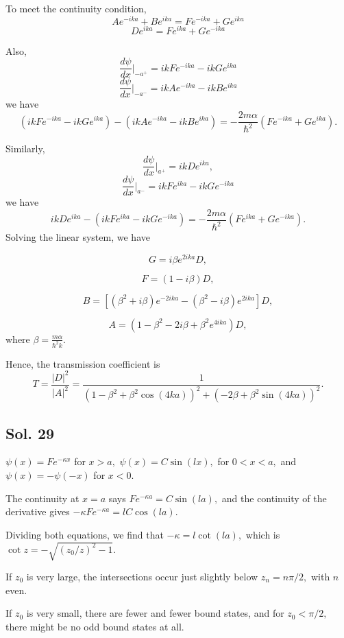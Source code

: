   To meet the continuity condition, 
    $$
    Ae^{-ika}+Be^{ika} = Fe^{-ika}+Ge^{ika}
    $$
    $$
    De^{ika} = Fe^{ika}+Ge^{-ika}
    $$

    Also,
    $$
    \frac{d\psi}{dx}\bigg|_{-a^+}=
    ikFe^{-ika} - ikGe^{ika}
    $$
    $$
    \frac{d\psi}{dx}\bigg|_{-a^-}=
    ikAe^{-ika}-ikBe^{ika}
    $$
    we have
    $$
    (ikFe^{-ika} - ikGe^{ika}) -
    (ikAe^{-ika}-ikBe^{ika})
    =-\frac{2m\alpha}{\hbar^2}
    (Fe^{-ika}+Ge^{ika}).
    $$
    
    Similarly,
     $$
    \frac{d\psi}{dx}\bigg|_{a^+}=ik De^{ika},
    $$
    $$
    \frac{d\psi}{dx}\bigg|_{a^-}=ikFe^{ika}-ikGe^{-ika}
    $$
    we have
    $$
    ik De^{ika} - (ikFe^{ika}-ikGe^{-ika})
    =-\frac{2m\alpha}{\hbar^2}(Fe^{ika}+Ge^{-ika}).  
    $$
    Solving the linear system, we have

    
    $$
    G = i\beta e^{2ika} D,
    $$
    
    $$
    F = (1-i\beta) D,
    $$
    
    $$
    B = [(\beta^2+i\beta)e^{-2ika}-(\beta^2-i\beta)e^{2ika}] D,
    $$

    
    $$
    A = (1-\beta^2-2i\beta+\beta^2e^{4ika}) D,
    $$
    where $\beta = \frac{m\alpha}{\hbar^2k}.$

    Hence, the transmission coefficient is 
    $$
    T = \frac{|D|^2}{|A|^2} 
    =
    \frac{1}{(1-\beta^2+\beta^2\cos(4ka))^2 + (-2\beta+\beta^2\sin(4ka))^2}.
    $$

    \subsection*{Sol. 29}
    $\psi(x) = Fe^{-\kappa x}$ for $x>a,$ $\psi(x)=C\sin(lx),$ for $0<x<a,$ and $\psi(x)=-\psi(-x)$ for $x<0.$

    The continuity at $x=a$ says $Fe^{-\kappa a}=C\sin(la),$ and the continuity of the derivative gives 
    $-\kappa Fe^{-\kappa a}=lC\cos(la).$

    Dividing both equations, we find that $-\kappa = l\cot(la),$ which is $\cot z = -\sqrt{(z_0/z)^2-1}.$

    

    If $z_0$ is very large, the intersections occur  just slightly below $z_n=n\pi/2,$ with $n$ even.

    

    If $z_0$ is very small, there are fewer and fewer bound states, and for $z_0<\pi/2,$ there might be no odd bound states at all.

